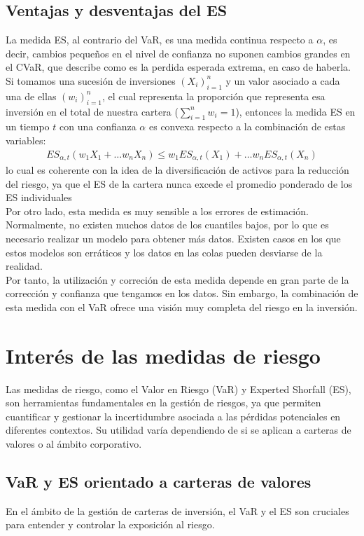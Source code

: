 \documentclass[11pt]{book}
\theoremstyle{plain} %
\theoremstyle{definition} %
\begin{document}
\subsection{Ventajas y desventajas del ES}
La medida ES, al contrario del VaR, es una medida continua respecto a $\alpha$, 
es decir, cambios pequeños en el nivel de confianza no suponen cambios 
grandes en el CVaR, que describe como es la perdida esperada extrema, en 
caso de haberla. Si tomamos una sucesión de inversiones $(X_i)_{i=1}^n$ y un 
valor asociado a cada una de ellas $(w_i)_{i=1}^n$, el cual representa la 
proporción que representa esa inversión en el total de nuestra cartera 
($\sum_{i=1}^n w_i = 1$), entonces la medida ES en un tiempo $t$ con una 
confianza $\alpha$ es convexa respecto a la  combinación de estas variables:
\begin{align*}
   ES_{\alpha, t}(w_1X_1+\dots w_nX_n) \leq w_1ES_{\alpha, t}(X_1)+\dots w_nES_{\alpha, t}(X_n)
\end{align*}
lo cual es coherente con la idea de la diversificación de activos para la 
reducción del riesgo, ya que el ES de la cartera nunca excede el promedio 
ponderado de los ES individuales\\

Por otro lado, esta medida es muy sensible a los errores de estimación. 
Normalmente, no existen muchos datos de los cuantiles bajos, por lo que es 
necesario realizar un modelo para obtener más datos. Existen casos en los 
que estos modelos son erráticos y los datos en las colas pueden desviarse de 
la realidad.\\

Por tanto, la utilización y correción de esta medida depende en gran parte 
de la corrección y confianza que tengamos en los datos. Sin embargo, 
la combinación de esta medida con el VaR ofrece una visión muy 
completa del riesgo en la inversión.

\section{Interés de las medidas de riesgo}
Las medidas de riesgo, como el Valor en Riesgo (VaR) y Experted Shorfall (ES), 
son herramientas fundamentales en la gestión de riesgos, ya que permiten 
cuantificar y gestionar la incertidumbre asociada a las pérdidas potenciales 
en diferentes contextos. Su utilidad varía dependiendo de si se aplican a 
carteras de valores o al ámbito corporativo.
\subsection{VaR y ES orientado a carteras de valores}
En el ámbito de la gestión de carteras de inversión, el VaR y el ES son 
cruciales para entender y controlar la exposición al riesgo.\\
\end{document}

